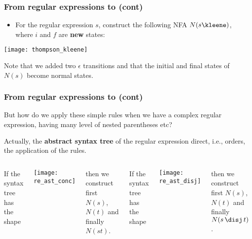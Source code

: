 %
\begin{frame}
\frametitle{From regular expressions to  (cont)}

\begin{itemize}

  \item For the regular expression \(s\)\kleene, construct the following
    NFA \(N(s\text{\kleene})\), where \(i\) and \(f\) are \textbf{new}
    states:

\end{itemize}
\begin{center}
\texttt{[image: thompson\_kleene]}
\end{center}
Note that we added two \(\epsilon\) transitions and that the initial
and final states of \(N(s)\) become normal states.

\end{frame}

%
\begin{frame}
\frametitle{From regular expressions to  (cont)}

But how do we apply these simple rules when we have a complex regular
expression, having many level of nested parentheses etc?

\bigskip

Actually, the \textbf{abstract syntax tree} of the regular expression
direct, i.e., orders, the application of the rules.

\bigskip

\begin{columns}

   If the syntax tree has the shape
  \begin{center}
    \texttt{[image: re\_ast\_conc]}
  \end{center}
  then we construct first \(N(s)\), \(N(t)\) and finally \(N (st)\).

   If the syntax tree has the shape
  \begin{center}
    \texttt{[image: re\_ast\_disj]}
  \end{center}
  then we construct first \(N(s)\), \(N(t)\) and finally \(N (s \,
  \text{\disj} \, t)\).

\end{columns}

\end{frame}

